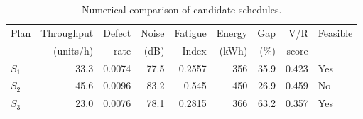 \begin{table}[htbp]
\centering
\caption{Numerical comparison of candidate schedules.}
\label{tab:numerical-sim}
\small
\begin{tabular}{@{}lrrrrrrrl@{}}
\toprule
Plan & Throughput & Defect & Noise & Fatigue & Energy & Gap & V/R & Feasible \\
     & (units/h)  & rate   & (dB)  & Index   & (kWh)  & (\%) & score &         \\
\midrule
$S_{1}$ & 33.3 & 0.0074 & 77.5 & 0.2557 & 356 & 35.9 & 0.423 & Yes \\
$S_{2}$ & 45.6 & 0.0096 & 83.2 & 0.545 & 450 & 26.9 & 0.459 & No \\
$S_{3}$ & 23.0 & 0.0076 & 78.1 & 0.2815 & 366 & 63.2 & 0.357 & Yes \\
\bottomrule
\end{tabular}
\end{table}
